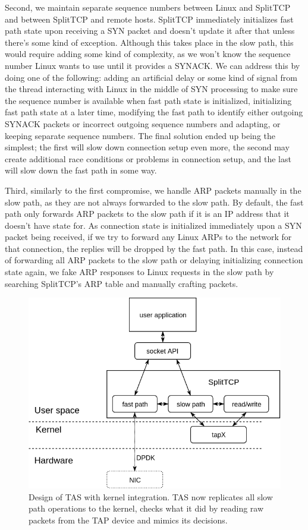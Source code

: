 Second, we maintain separate sequence numbers between Linux and SplitTCP and 
between SplitTCP and remote hosts. SplitTCP immediately initializes fast path 
state upon receiving a SYN packet and doesn't update it after that unless 
there's some kind of exception. Although this takes place in the slow path,
this would require adding some kind of complexity, as we won't know the sequence
number Linux wants to use until it provides a SYNACK. We can address this by 
doing one of the following: adding an artificial delay or some kind of signal 
from the thread interacting with Linux in the middle of SYN processing to make 
sure the sequence number is available when fast path state is initialized, 
initializing fast path state at a later time, modifying the fast path to 
identify either outgoing SYNACK packets or incorrect outgoing sequence numbers
and adapting, or keeping separate sequence numbers. The final solution ended up 
being the simplest; the first will slow down connection setup even more, the 
second may create additional race conditions or problems in connection setup, 
and the last will slow down the fast path in some way.

Third, similarly to the first compromise, we handle ARP packets manually in 
the slow path, as they are not always forwarded to the slow path. By default,
the fast path only forwards ARP packets to the slow path if it is an IP address
that it doesn't have state for. As connection state is initialized immediately 
upon a SYN packet being received, if we try to forward any Linux ARPs to the 
network for that connection, the replies will be dropped by the fast path. In
this case, instead of forwarding all ARP packets to the slow path or delaying
initializing connection state again, we fake ARP responses to Linux requests 
in the slow path by searching SplitTCP's ARP table and manually crafting 
packets. 

\begin{figure}
\centering
\includegraphics[width=0.7\columnwidth]{figures/splittcp.png}
\caption{Design of TAS with kernel integration. TAS now replicates all slow path operations to the kernel, checks what
it did by reading raw packets from the TAP device and mimics its decisions.}
\label{fig:splittcp_tap}
\end{figure}

